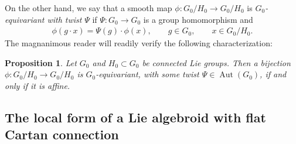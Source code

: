 \documentclass[pdftex]{sigma}
\DeclareMathOperator{\automorphism}{Aut}
\numberwithin{equation}{section}
\newtheorem{PropositionBlaom}[TheoremBlaom]{Proposition}
 { \theoremstyle{definition}
\newtheorem{CounterexampleBlaom}[TheoremBlaom]{Counterexample}
\newtheorem{RemarkBlaom}[TheoremBlaom]{Remark} }
\begin{document}
On the other hand, we say that a smooth map $\phi \colon G_0/H_0
\rightarrow G_0/H_0$ is {\em $G_0$-equivariant with twist} $\Psi$ if
$\Psi \colon G_0 \rightarrow G_0$ is a group homomorphism and
  \begin{gather*}
    \phi(g \cdot  x)=\Psi(g) \cdot \phi(x), \qquad g \in G_0,\qquad x \in G_0/H_0.
  \end{gather*}
  The magnanimous reader will readily verify the following
  characterization:
  \begin{PropositionBlaom}\label{Proposition2.3}
  Let $G_0$ and $H_0 \subset G_0$ be connected Lie groups. Then a
  bijection $\phi \colon G_0/H_0 \rightarrow G_0/H_0$ is
  $G_0$-equivariant, with some twist $\Psi \in \automorphism(G_0)$, if
  and only if it is affine.
\end{PropositionBlaom}



\subsection{The local form of a Lie algebroid with f\/lat Cartan
  connection}\label{localform}
\end{document}
